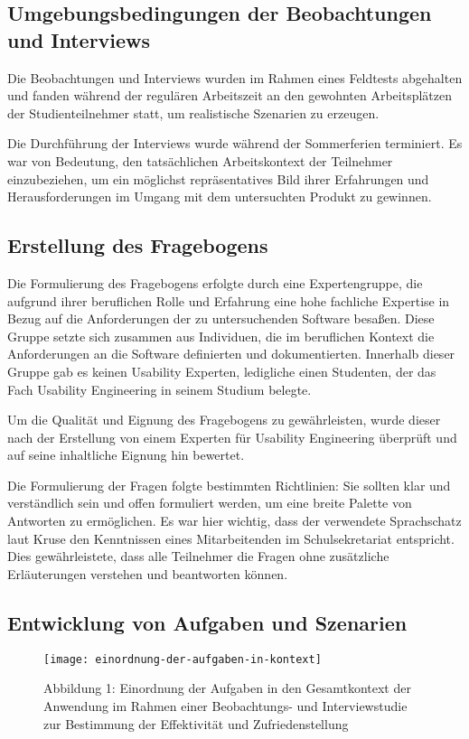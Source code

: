 \subsection{Umgebungsbedingungen der Beobachtungen und Interviews}

Die Beobachtungen und Interviews wurden im Rahmen eines Feldtests abgehalten und fanden während der regulären Arbeitszeit an den gewohnten Arbeitsplätzen der Studienteilnehmer statt, um realistische Szenarien zu erzeugen. 

Die Durchführung der Interviews wurde während der Sommerferien terminiert. Es war von Bedeutung, den tatsächlichen Arbeitskontext der Teilnehmer einzubeziehen, um ein möglichst repräsentatives Bild ihrer Erfahrungen und Herausforderungen im Umgang mit dem untersuchten Produkt zu gewinnen.

\subsection{Erstellung des Fragebogens}

Die Formulierung des Fragebogens erfolgte durch eine Expertengruppe, die aufgrund ihrer beruflichen Rolle und Erfahrung eine hohe fachliche Expertise in Bezug auf die Anforderungen der zu untersuchenden Software besaßen. Diese Gruppe setzte sich zusammen aus Individuen, die im beruflichen Kontext die Anforderungen an die Software definierten und dokumentierten. Innerhalb dieser Gruppe gab es keinen Usability Experten, ledigliche einen Studenten, der das Fach \glqq Usability Engineering\grqq{} in seinem Studium belegte.

Um die Qualität und Eignung des Fragebogens zu gewährleisten, wurde dieser nach der Erstellung von einem Experten für Usability Engineering überprüft und auf seine inhaltliche Eignung hin bewertet.

Die Formulierung der Fragen folgte bestimmten Richtlinien: Sie sollten klar und verständlich sein und offen formuliert werden, um eine breite Palette von Antworten zu ermöglichen. Es war hier wichtig, dass der verwendete Sprachschatz laut Kruse den Kenntnissen eines Mitarbeitenden im Schulsekretariat entspricht.\cite{Kruse_2015} Dies gewährleistete, dass alle Teilnehmer die Fragen ohne zusätzliche Erläuterungen verstehen und beantworten können.

\subsection{Entwicklung von Aufgaben und Szenarien}
\begin{figure}[H]
    \caption{Abbildung 1: Einordnung der Aufgaben in den Gesamtkontext der Anwendung im Rahmen einer Beobachtungs- und Interviewstudie zur Bestimmung der Effektivität und Zufriedenstellung}
    \texttt{[image: einordnung-der-aufgaben-in-kontext]}
\end{figure}

